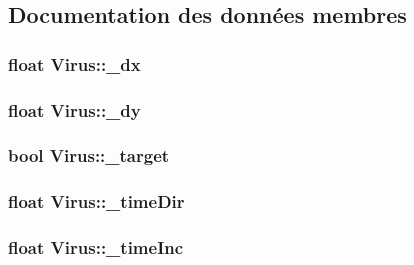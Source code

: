 \subsection{Documentation des données membres}
\hypertarget{classVirus_a7462d0029011b9749003ac3fb551f62e}{
\subsubsection[{\_\-dx}]{\setlength{\rightskip}{0pt plus 5cm}float {\bf Virus::\_\-dx}}}
\label{classVirus_a7462d0029011b9749003ac3fb551f62e}
\hypertarget{classVirus_ae1ab8da9908880b925b58f6f229798d1}{
\subsubsection[{\_\-dy}]{\setlength{\rightskip}{0pt plus 5cm}float {\bf Virus::\_\-dy}}}
\label{classVirus_ae1ab8da9908880b925b58f6f229798d1}
\hypertarget{classVirus_ad6fc67768ebaff383c125b771935ed10}{
\subsubsection[{\_\-target}]{\setlength{\rightskip}{0pt plus 5cm}bool {\bf Virus::\_\-target}}}
\label{classVirus_ad6fc67768ebaff383c125b771935ed10}
\hypertarget{classVirus_a1d5abc2e25b163a6304fd38d8f99c0aa}{
\subsubsection[{\_\-timeDir}]{\setlength{\rightskip}{0pt plus 5cm}float {\bf Virus::\_\-timeDir}}}
\label{classVirus_a1d5abc2e25b163a6304fd38d8f99c0aa}
\hypertarget{classVirus_ab9cf8a0bc3ed6a460f2dae403af30b57}{
\subsubsection[{\_\-timeInc}]{\setlength{\rightskip}{0pt plus 5cm}float {\bf Virus::\_\-timeInc}}}

